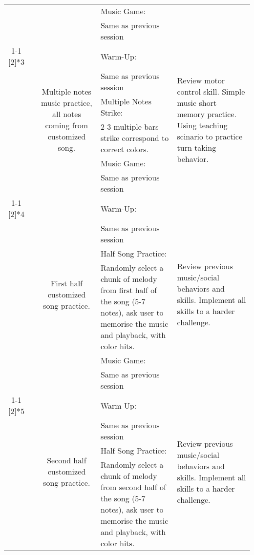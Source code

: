 \begin{table}[htbp]
\begin{tabular}{|c|c|c|p{16.07em}|l|}
          &       &       & Music Game: &  \\
          &       &       & Same as previous session &  \\
\cmidrule{1-1}\cmidrule{3-5}    \multirow{6}[2]{*}{3} &       & \multicolumn{1}{c|}{\multirow{6}[2]{*}{Multiple notes music practice, all notes coming from customized song.}} & Warm-Up:  & \multicolumn{1}{l|}{\multirow{6}[2]{*}{Review motor control skill. Simple music short memory practice. Using teaching scinario to practice turn-taking behavior.}} \\
          &       &       & Same as previous session &  \\
          &       &       & Multiple Notes Strike: &  \\
          &       &       & 2-3 multiple bars strike correspond to correct colors. &  \\
          &       &       & Music Game: &  \\
          &       &       & Same as previous session &  \\
\cmidrule{1-1}\cmidrule{3-5}    \multirow{6}[2]{*}{4} &       & \multicolumn{1}{c|}{\multirow{6}[2]{*}{First half customized song practice.}} & Warm-Up:  & \multicolumn{1}{l|}{\multirow{6}[2]{*}{Review previous music/social behaviors and skills. Implement all skills to a harder challenge. }} \\
          &       &       & Same as previous session &  \\
          &       &       & Half Song Practice: &  \\
          &       &       & Randomly select a chunk of melody from first half of the song (5-7 notes), ask user to memorise the music and playback, with color hits. &  \\
          &       &       & Music Game: &  \\
          &       &       & Same as previous session &  \\
\cmidrule{1-1}\cmidrule{3-5}    \multirow{6}[2]{*}{5} &       & \multicolumn{1}{c|}{\multirow{6}[2]{*}{Second half customized song practice.}} & Warm-Up:  & \multicolumn{1}{l|}{\multirow{6}[2]{*}{Review previous music/social behaviors and skills. Implement all skills to a harder challenge. }} \\
          &       &       & Same as previous session &  \\
          &       &       & Half Song Practice: &  \\
          &       &       & Randomly select a chunk of melody from second half of the song (5-7 notes), ask user to memorise the music and playback, with color hits. &  \\

\end{tabular}
\end{table}
